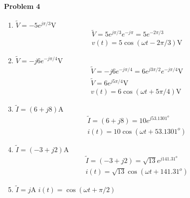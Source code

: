 \documentclass[12pt]{scrartcl}
\begin{document}
{{\paragraph{Problem 4}
\begin{enumerate}[label=(\alph*)]
	\item $\tilde{V}=-5e^{j\pi/3} \si{\volt}$
	\begin{align*}
	& \tilde{V}=5e^{j\pi/3}e^{-j\pi} = 5e^{-2\pi/3} \\
	& v(t) = 5\cos(\omega t  - 2\pi /3)  \si{\volt}
	\end{align*}
	\item $\tilde{V}=-j6e^{-j\pi/4} \si{\volt}$
	\begin{align*}
	& \tilde{V}=-j6e^{-j\pi/4}=6e^{j3\pi/2}e^{-j\pi/4} \si{\volt} \\
	& \tilde{V}= 6e^{j5\pi /4}  \si{\volt} \\
	& v(t) = 6 \cos(\omega t + 5\pi /4) \si{\volt}
	\end{align*}
	\item $\tilde{I}=(6+j8)\si{\ampere}$
	\begin{align*}
	& \tilde{I}=(6+j8)=10e^{j53.1301^{o}} \\
	& i(t) = 10\cos(\omega t + 53.1301^o)
	\end{align*}
	\item $\tilde{I}=(-3+j2)\si{\ampere}$
	\begin{align*}
	& \tilde{I}=(-3+j2)=\sqrt{13}e^{j141.31^{o}} \\
	& i(t) = \sqrt{13}\cos(\omega t + 141.31^{o})
	\end{align*}
	\item $\tilde{I}=j\si{\ampere}$ \newline
	$i(t)=\cos(\omega t + \pi /2)$
\end{enumerate}
}}
\end{document}
